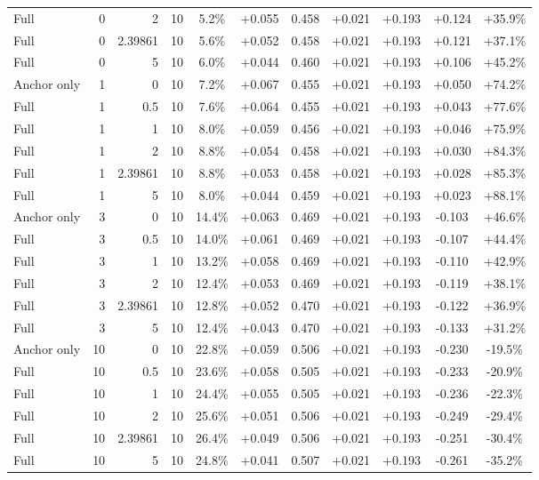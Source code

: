 \begin{table}[htbp]
\begin{tabular}{lrrrccccccc}
Full & 0 & 2 & 10 & 5.2\% & +0.055 & 0.458 & +0.021 & +0.193 & +0.124 & +35.9\% \\
Full & 0 & 2.39861 & 10 & 5.6\% & +0.052 & 0.458 & +0.021 & +0.193 & +0.121 & +37.1\% \\
Full & 0 & 5 & 10 & 6.0\% & +0.044 & 0.460 & +0.021 & +0.193 & +0.106 & +45.2\% \\
Anchor only & 1 & 0 & 10 & 7.2\% & +0.067 & 0.455 & +0.021 & +0.193 & +0.050 & +74.2\% \\
Full & 1 & 0.5 & 10 & 7.6\% & +0.064 & 0.455 & +0.021 & +0.193 & +0.043 & +77.6\% \\
Full & 1 & 1 & 10 & 8.0\% & +0.059 & 0.456 & +0.021 & +0.193 & +0.046 & +75.9\% \\
Full & 1 & 2 & 10 & 8.8\% & +0.054 & 0.458 & +0.021 & +0.193 & +0.030 & +84.3\% \\
Full & 1 & 2.39861 & 10 & 8.8\% & +0.053 & 0.458 & +0.021 & +0.193 & +0.028 & +85.3\% \\
Full & 1 & 5 & 10 & 8.0\% & +0.044 & 0.459 & +0.021 & +0.193 & +0.023 & +88.1\% \\
Anchor only & 3 & 0 & 10 & 14.4\% & +0.063 & 0.469 & +0.021 & +0.193 & -0.103 & +46.6\% \\
Full & 3 & 0.5 & 10 & 14.0\% & +0.061 & 0.469 & +0.021 & +0.193 & -0.107 & +44.4\% \\
Full & 3 & 1 & 10 & 13.2\% & +0.058 & 0.469 & +0.021 & +0.193 & -0.110 & +42.9\% \\
Full & 3 & 2 & 10 & 12.4\% & +0.053 & 0.469 & +0.021 & +0.193 & -0.119 & +38.1\% \\
Full & 3 & 2.39861 & 10 & 12.8\% & +0.052 & 0.470 & +0.021 & +0.193 & -0.122 & +36.9\% \\
Full & 3 & 5 & 10 & 12.4\% & +0.043 & 0.470 & +0.021 & +0.193 & -0.133 & +31.2\% \\
Anchor only & 10 & 0 & 10 & 22.8\% & +0.059 & 0.506 & +0.021 & +0.193 & -0.230 & -19.5\% \\
Full & 10 & 0.5 & 10 & 23.6\% & +0.058 & 0.505 & +0.021 & +0.193 & -0.233 & -20.9\% \\
Full & 10 & 1 & 10 & 24.4\% & +0.055 & 0.505 & +0.021 & +0.193 & -0.236 & -22.3\% \\
Full & 10 & 2 & 10 & 25.6\% & +0.051 & 0.506 & +0.021 & +0.193 & -0.249 & -29.4\% \\
Full & 10 & 2.39861 & 10 & 26.4\% & +0.049 & 0.506 & +0.021 & +0.193 & -0.251 & -30.4\% \\
Full & 10 & 5 & 10 & 24.8\% & +0.041 & 0.507 & +0.021 & +0.193 & -0.261 & -35.2\% \\

\end{tabular}
\end{table}
